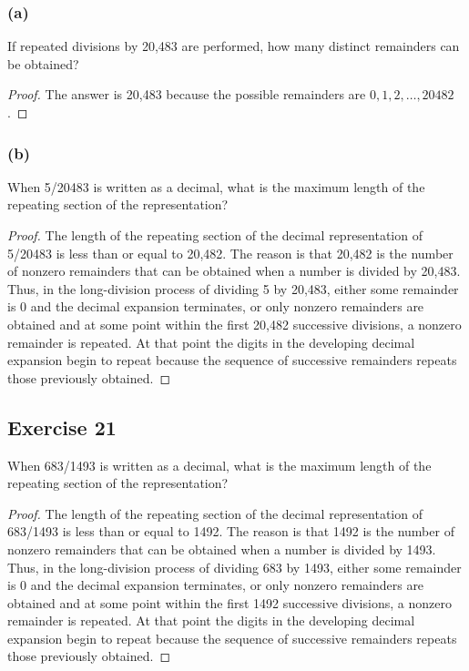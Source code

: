 \documentclass[14pt]{extarticle}
\begin{document}
\subsubsection{(a)}
If repeated divisions by 20,483 are performed, how many distinct remainders can be obtained?

\begin{proof}
The answer is 20,483 because the possible remainders are \(0, 1, 2, \ldots, 20482\).
\end{proof}

\subsubsection{(b)}
When 5/20483 is written as a decimal, what is the maximum length of the repeating section of the representation?

\begin{proof}
The length of the repeating section of the decimal representation of 5/20483 is less than or equal to 20,482. 
The reason is that 20,482 is the number of nonzero remainders that can be obtained when a number is divided by 
20,483. Thus, in the long-division process of dividing 5 by 20,483, either some remainder is 0 and the decimal 
expansion terminates, or only nonzero remainders are obtained and at some point within the first 20,482 
successive divisions, a nonzero remainder is repeated. At that point the digits in the developing decimal expansion 
begin to repeat because the sequence of successive remainders repeats those previously obtained.
\end{proof}

\subsection{Exercise 21}
When 683/1493 is written as a decimal, what is the maximum length of the repeating section of the representation?

\begin{proof}
The length of the repeating section of the decimal representation of 683/1493 is less than or equal to 1492. 
The reason is that 1492 is the number of nonzero remainders that can be obtained when a number is divided by 1493. 
Thus, in the long-division process of dividing 683 by 1493, either some remainder is 0 and the decimal expansion 
terminates, or only nonzero remainders are obtained and at some point within the first 1492 successive divisions, a 
nonzero remainder is repeated. At that point the digits in the developing decimal expansion begin to repeat because 
the sequence of successive remainders repeats those previously obtained.
\end{proof}
\end{document}
